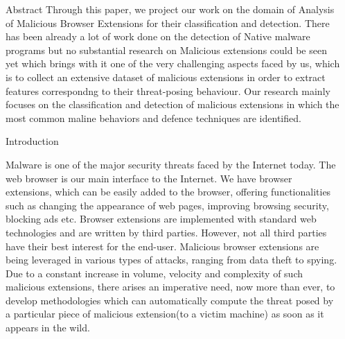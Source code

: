 \documentclass[final]{beamer}
\newlength{\sepwid}
\newlength{\onecolwid}
\begin{document}
\begin{frame}[t] %

\begin{columns}[t] %

\begin{column}{\sepwid}\end{column} %

\begin{column}{\onecolwid} %


\begin{alertblock}{Abstract}
Through this paper, we project our work on the domain of Analysis of Malicious Browser Extensions for their classification and detection. There has been already a lot of work done on the detection of Native malware programs but no substantial research on Malicious extensions could be seen yet which brings with it one of the very challenging aspects faced by us, which is to collect an extensive dataset of malicious extensions in order to extract features correspondng to their threat-posing behaviour. Our research mainly focuses on the classification and detection of malicious extensions in which the most common maline behaviors and defence techniques are identified.

\end{alertblock}


\begin{block}{Introduction}

Malware is one of the major security threats faced by the Internet today. The web browser is our main interface to the Internet. We have browser extensions, which can be easily added to the browser, offering functionalities such as changing the appearance of web pages, improving browsing security, blocking ads etc. Browser extensions are implemented with standard web technologies and are written by third parties. However, not all third parties have their best interest for the end-user. Malicious browser extensions are being leveraged in various types of attacks, ranging from data theft to spying. Due to a constant increase in volume, velocity and complexity of such malicious extensions, there arises an imperative need, now more than ever, to develop methodologies which can automatically compute the threat posed by a particular piece of malicious extension(to a victim machine) as soon as it appears in the wild.


\end{block}
\end{column}
\end{columns}
\end{frame}
\end{document}
